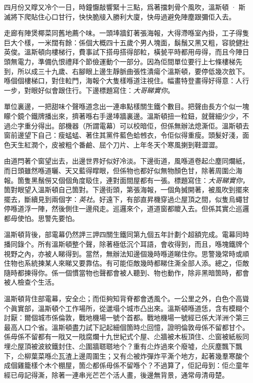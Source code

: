 四月份又𥋇又冷个一日，時鐘懨敲響緊十三點，爲著擋刺骨个風吹，溫斯頓 · 斯滅將下爬貼住心口甘行，快快脆𤗈入勝利大廈，快毋過避免陣塵跟彌佢入去。

走廊有陣煲椰菜同舊地薦个味。一頭埲牆釘著張海報，大得滯喺室內掛，工子得隻巨大个樣，一米闊有餘：係個大概四十五歲个男人塊面，鬍鬚又黑又粗，容貌健壯英俊。溫斯頓向樓梯行，費事試下搭毋搭得部𨋢，橫㼭平時都用毋得，而且今陣日頭無電力，準備仇恨禮拜个節儉運動个一部分。因為佢間單位要行上七條樓梯先到，所以成三十九歲、右腳眼上邊生靜脈曲張性潰瘍个溫斯頓，要停低幾次敨下。喺個個樓梯口，對住𨋢門，海報个大隻樣喺道注視住。幅畫特登畫得好得意：人行一步，對眼好似會跟住行。下邊標題寫住：\emph{大哥睇實你}。

單位裏邊，一把甜味个聲喺道念出一連串點樣關生鐵个數目。把聲由長方个似一塊矇个鏡个鐵牌播出來，擠著喺右手邊埲牆裏邊。溫斯頓扭一粒鈕，就聲細少少，不過尐字重分得出。部機器（所謂電幕）可以校暗佢，但係無辦法熄澌佢。溫斯頓去窗前邊望下自己：瘦蜢蜢、著住其黨件藍色蛤乸衣，令佢似得重瘦。頭髮好淺，面色天生紅潤个，皮被粗个番鹼、屈个刀片、上年冬天个寒風揦到鞋澀澀。

由道閂著个窗望出去，出邊世界好似好冷淡。下邊街道，風喺道卷起尐塵同爛紙，而日頭雖然喺道曬、天又藍得𥋇眼，但係物也都好似無物顏色甘，除著周圍尐海報。箇隻黑鬚僗又個個角度𥄫住，連對面間屋都有一張。標題寫住：\emph{大哥睇實你}，箇對眼望入溫斯頓自己箇對。下邊街頭，第張海報，一個角搣開著，被風吹到擺來擺去，斷續見到兩個字：\emph{英社}。好遠下，有部直昇機穿過尐屋頂之間，似隻烏蠅甘停喺道浮一陣，然後側住一邊飛走。巡邏來个，道道窗都𥊙入去。但係其實尐巡邏都毋使怕。思警先要怕。

溫斯頓背後，部電幕仍然䛅三䛅四關生鐵同第九個五年計劃个超額完成。電幕同時播同錄个。所有溫斯頓整个聲，除著極低沉个耳語，會收得到，而且，喺塊鐵牌个視野之內，亦被人睇得到。當然，無辦法知邊個幾時喺道睇住你。思警幾常時或順住物也系統揀某人來睇又要靠估。有可能佢敵幾時都睇住澌全部人添。總之，佢敵隨時都揀得你。係一個慣當物也聲都會被人聽到、物也動作，除非黑暗箇時，都會被人檢查个生活。

溫斯頓背住部電幕，安全尐；而佢夠知背脊都會透風个。一公里之外，白色个高聳个眞實部，溫斯頓个工作場所，從邋塌个城市凸出來。溫斯頓喺道恁，含有模糊个討厭：爾個城市係倫敦，戰地機場一號个首都。戰地機場一號經已係大洋洲个第三最高人口个省。溫斯頓盡力試下記起細個箇時尐回憶，證明倫敦毋係不留都甘个。係毋係不留都有一戙又一戙腐爛十九世紀式个屋、尐牆被木板頂住、尐窗被紙板同埋尐屋頂被波紋鐵封住、尐圍牆𦖿𦖿地个？重有尐炸過來个廢墟，尐灰塵飄下飄下，尐柳葉菜喺尐瓦渣上邊周圍生；又有尐被炸彈炸平澌个地方，起著幾羣寒酸个成個雞籠樣个木个棚屋，箇尐都係毋係不留喺个？不過算了，佢記毋到：佢尐童年經已毋記得澌，除著一連串光芒芒个活人畫，後邊無背景，通常毋清毋楚。

